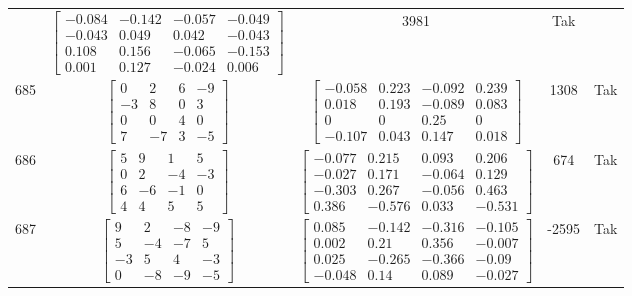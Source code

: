 \documentclass[a4paper,12pt]{article}
\begin{document}
\begin{tabular}{c c c c c}
&
$\begin{bmatrix} -0.084 & -0.142 & -0.057 & -0.049 \\ -0.043 & 0.049 & 0.042 & -0.043 \\ 0.108 & 0.156 & -0.065 & -0.153 \\ 0.001 & 0.127 & -0.024 & 0.006 \end{bmatrix}$
&
3981
&
Tak
\\
685
&
$\begin{bmatrix} 0 & 2 & 6 & -9 \\ -3 & 8 & 0 & 3 \\ 0 & 0 & 4 & 0 \\ 7 & -7 & 3 & -5 \end{bmatrix}$
&
$\begin{bmatrix} -0.058 & 0.223 & -0.092 & 0.239 \\ 0.018 & 0.193 & -0.089 & 0.083 \\ 0 & 0 & 0.25 & 0 \\ -0.107 & 0.043 & 0.147 & 0.018 \end{bmatrix}$
&
1308
&
Tak
\\
686
&
$\begin{bmatrix} 5 & 9 & 1 & 5 \\ 0 & 2 & -4 & -3 \\ 6 & -6 & -1 & 0 \\ 4 & 4 & 5 & 5 \end{bmatrix}$
&
$\begin{bmatrix} -0.077 & 0.215 & 0.093 & 0.206 \\ -0.027 & 0.171 & -0.064 & 0.129 \\ -0.303 & 0.267 & -0.056 & 0.463 \\ 0.386 & -0.576 & 0.033 & -0.531 \end{bmatrix}$
&
674
&
Tak
\\
687
&
$\begin{bmatrix} 9 & 2 & -8 & -9 \\ 5 & -4 & -7 & 5 \\ -3 & 5 & 4 & -3 \\ 0 & -8 & -9 & -5 \end{bmatrix}$
&
$\begin{bmatrix} 0.085 & -0.142 & -0.316 & -0.105 \\ 0.002 & 0.21 & 0.356 & -0.007 \\ 0.025 & -0.265 & -0.366 & -0.09 \\ -0.048 & 0.14 & 0.089 & -0.027 \end{bmatrix}$
&
-2595
&
Tak
\\

\end{tabular}
\end{document}
